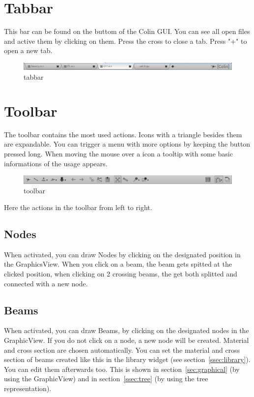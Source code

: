 \documentclass[a4paper,11pt]{report}
\begin{document}
\section{Tabbar}
\label{sec:tabbar}
This bar can be found on the buttom of the Colin GUI. You can see all open files and active them by clicking on them. Press the cross to close a tab. Press "+" to open a new tab.
\begin{figure}[H]
\includegraphics[width=\textwidth]{../pictures/tabbar.png}
\caption{tabbar}
\label{pic:tabbar}
\end{figure}

\section{Toolbar}
\label{sec:toolbar}

The toolbar contains the most used actions. Icons with a triangle besides them are expandable. You can trigger a menu with more options by keeping the button pressed long. When moving the mouse over a icon a tooltip with some basic informations of the usage appears. 

\begin{figure}[H]
\includegraphics[width=\textwidth]{../pictures/toolbar.png}
\caption{toolbar}
\label{pic:toolbar}
\end{figure}

Here the actions in the toolbar from left to right.
\subsection{Nodes}
When activated, you can draw Nodes by clicking on the designated position in the GraphicsView. When you click on a beam, the beam gets spitted at the clicked position, when clicking on 2 crossing beams, the get both splitted and connected with a new node.

\subsection{Beams}
When activated, you can draw Beams, by clicking on the designated nodes in the GraphicView. If you do not click on a node, a new node will be created. Material and cross section are chosen automatically. You can set the material and cross section of beams created like this in the library widget (see section~\ref{ssec:library}). You can edit them afterwards too. This is shown in section~\ref{sec:graphical} (by using the GraphicView) and in section~\ref{ssec:tree} (by using the tree representation).
\end{document}
